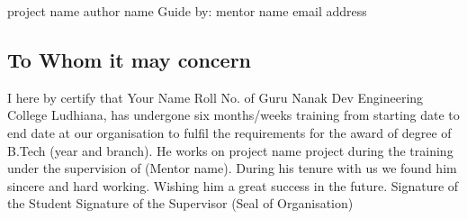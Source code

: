 \documentclass[12pt]{myclass}
\subtitle{subtitle..}
\author{your name}
\institute{Institute name}
\newcommand{\student}{\vskip 2.5cm}
\newcommand{\supervisor}{\vskip 2cm}
\newcommand{\stamp}{\vskip 2.5cm}
\newcommand{\ppttitle}{\begin{center}
\LARGE project name
\vskip 1cm
\large author name
\vskip 0.3cm
\large Guide by: mentor name
\vskip 0.3cm
\large email address
\end{center}}
\begin{document}
\begin{print}
 \maketitle                                 %
\end{print}

\begin{screen}
\ppttitle                                  %
\end{screen}

\begin{print}
\cfoot{\thepage}                       %
\section*{To Whom it may concern}                        %
I here by certify that Your Name Roll No.   of Guru Nanak Dev Engineering College Ludhiana, has undergone six months/weeks training from starting date to end date at our organisation to fulfil the requirements for the award of degree of B.Tech (year and branch). He works on {project name} project during the training under the supervision of (Mentor name). During his tenure with us we found him sincere and hard working. Wishing him a great success in the future.
\student
Signature of the Student
\supervisor
Signature of the Supervisor 
\stamp
(Seal of Organisation)


\end{print}
\end{document}
